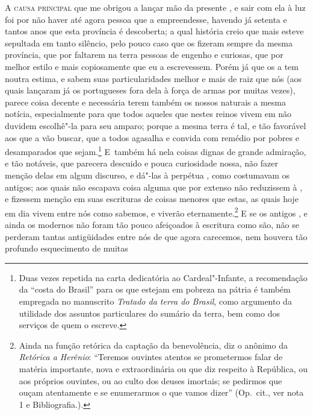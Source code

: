 \noindent\textsc{A causa principal} que me obrigou a lançar mão da presente , e
sair com ela à luz foi por não haver até agora pessoa que a empreendesse,
havendo já setenta e tantos anos que esta província é descoberta; a
qual história creio que mais esteve sepultada em tanto silêncio, pelo
pouco caso que os  fizeram sempre da mesma província, que
por faltarem na terra pessoas de engenho e curiosas, que por melhor			%
estilo e mais copiosamente que eu a escrevessem. Porém já que os
 a tem noutra estima, e sabem suas particularidades melhor
e mais de raiz que nós (aos quais lançaram já os portugueses fora dela
à força de armas por muitas vezes), parece coisa decente e necessária
terem também os nossos naturais a mesma notícia, especialmente para que			
todos aqueles que nestes reinos vivem em  não duvidem escolhê"-la
para seu amparo; porque a mesma terra é tal, e tão favorável aos que a
vão buscar, que a todos agasalha e convida com remédio por pobres e
desamparados que sejam.\footnote{ Duas vezes repetida na carta
dedicatória ao Cardeal"-Infante, a recomendação da ``costa
do Brasil'' para os  que estejam em pobreza na
pátria é também empregada no manuscrito \textit{Tratado da terra do Brasil},
como argumento da utilidade dos assuntos particulares do sumário da
terra, bem como dos serviços de quem o escreve.} \mbox{E também} há nela
coisas dignas de grande admiração, e tão notáveis, que parecera
descuido e pouca curiosidade nossa, não fazer menção delas em algum
discurso, e dá"-las à perpétua , como costumavam os antigos; aos
quais não escapava coisa alguma que por extenso não reduzissem à , 
e fizessem menção em suas escrituras de coisas menores que
estas, as quais hoje em dia vivem entre nós como sabemos, e viverão
eternamente.\footnote{ Ainda na função retórica da captação da
benevolência, diz o anônimo da \textit{Retórica a Herênio}:
``Teremos ouvintes atentos se prometermos falar de matéria
importante, nova e extraordinária ou que diz respeito à República, ou
aos próprios ouvintes, ou ao culto dos deuses imortais; se pedirmos que
ouçam atentamente e se enumerarmos o que vamos dizer'' 
(Op.~cit., ver nota 1 e Bibliografia.).} E se os antigos
, e ainda os modernos não foram tão pouco afeiçoados à
escritura como são, não se perderam tantas antigüidades entre nós de		%
que agora carecemos, nem houvera tão profundo esquecimento de muitas
